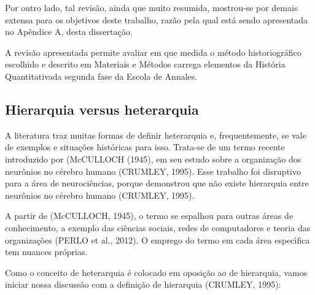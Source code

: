 \documentclass[
12pt,		%
openright,	%
twoside,  %
a4paper,			%
chapter=TITLE,		%
english,			%
french,				%
spanish,			%
brazil				%
]{USPSC-classe/USPSC}
\begin{document}
Por outro lado, tal revis\~ao, ainda que muito resumida, mostrou-se por demais extensa para os objetivos deste trabalho, raz\~ao pela qual est\'a sendo apresentada no Ap\^endice A, desta disserta\c{c}\~ao.









A revis\~ao apresentada permite avaliar em que medida o m\'etodo historiogr\'afico escolhido e descrito em Materiais e M\'etodos carrega elementos da \textquotedbl Hist\'oria Quantitativa\textquotedbl  da segunda fase da Escola de Annales.









\subsection[Hierarquia versus heterarquia]{Hierarquia versus heterarquia}\label{Hierarquia versus heterarquia}
A literatura traz muitas formas de definir heterarquia e, frequentemente, se vale de exemplos e situa\c{c}\~oes hist\'oricas para isso. Trata-se de um termo  recente introduzido  por (McCULLOCH (1945), em seu estudo sobre a organiza\c{c}\~ao dos neur\^onios no c\'erebro humano (CRUMLEY, 1995). Esse trabalho foi disruptivo para a \'area de neuroci\^encias, porque demonstrou que n\~ao existe hierarquia entre neur\^onios no c\'erebro humano  (CRUMLEY, 1995).









A partir de (McCULLOCH, 1945), o termo se espalhou para outras \'areas de conhecimento, a exemplo das ci\^encias sociais, redes de computadores e teoria das organiza\c{c}\~oes (PERLO et al., 2012). O emprego do termo em cada \'area espec\'{\i}fica tem nuances pr\'oprias.









Como o conceito de heterarquia \'e colocado em oposi\c{c}\~ao ao de hierarquia, vamos iniciar nossa discuss\~ao com a defini\c{c}\~ao de hierarquia (CRUMLEY, 1995):
\end{document}
